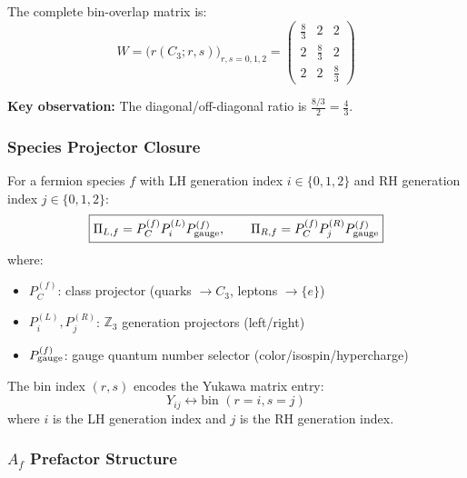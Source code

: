 The complete bin-overlap matrix is:
\begin{equation}
W = \big(r(C_3; r, s)\big)_{r,s=0,1,2} = 
\begin{pmatrix}
\frac{8}{3} & 2 & 2 \\[4pt]
2 & \frac{8}{3} & 2 \\[4pt]
2 & 2 & \frac{8}{3}
\end{pmatrix}
\end{equation}

\textbf{Key observation:} The diagonal/off-diagonal ratio is 
$\frac{8/3}{2} = \frac{4}{3}$.

\subsubsection{Species Projector Closure}

\begin{definition}\label{def:species_proj_closure}
For a fermion species $f$ with LH generation index $i \in \{0,1,2\}$ and 
RH generation index $j \in \{0,1,2\}$:
\begin{equation}
\boxed{\Pi_{L,f} = P_C^{(f)} P_i^{(L)} P_{\rm gauge}^{(f)}, \qquad 
\Pi_{R,f} = P_C^{(f)} P_j^{(R)} P_{\rm gauge}^{(f)}}
\end{equation}
where:
\begin{itemize}[nosep]
\item $P_C^{(f)}$: class projector (quarks $\to C_3$, leptons $\to \{e\}$)
\item $P_i^{(L)}, P_j^{(R)}$: $\mathbb{Z}_3$ generation projectors (left/right)
\item $P_{\rm gauge}^{(f)}$: gauge quantum number selector (color/isospin/hypercharge)
\end{itemize}
\end{definition}

\begin{definition}\label{def:rs_map}
The bin index $(r,s)$ encodes the Yukawa matrix entry:
\begin{equation}
Y_{ij} \longleftrightarrow \text{bin } (r = i, s = j)
\end{equation}
where $i$ is the LH generation index and $j$ is the RH generation index.
\end{definition}

\subsubsection{$A_f$ Prefactor Structure}

